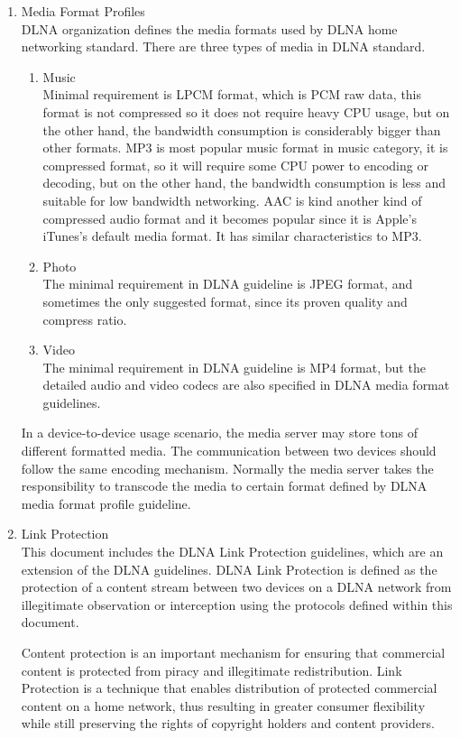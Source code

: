 \begin{enumerate}
\item Media Format Profiles \\
DLNA organization defines the media formats used by DLNA home networking standard. There are three types of media in DLNA standard.
\begin{enumerate}
\item Music \\
Minimal requirement is LPCM format, which is PCM raw data, this format is not compressed so it does not require heavy CPU usage, but on the other hand, the bandwidth consumption is considerably bigger than other formats.
MP3 is most popular music format in music category, it is compressed format, so it will require some CPU power to encoding or decoding, but on the other hand, the bandwidth consumption is less and suitable for low bandwidth networking.
AAC is kind another kind of compressed audio format and it becomes popular since it is Apple's iTunes's default media format. It has similar characteristics to MP3.
\item Photo \\
The minimal requirement in DLNA guideline is JPEG format, and sometimes the only suggested format, since its proven quality and compress ratio.
\item Video \\
The minimal requirement in DLNA guideline is MP4 format, but the detailed audio and video codecs are also specified in DLNA media format guidelines.
\end{enumerate}
In a device-to-device usage scenario, the media server may store tons of different formatted media. The communication between two devices should follow the same encoding mechanism. Normally the media server takes the responsibility to transcode the media to certain format defined by DLNA media format profile guideline. 
\item Link Protection \\
This document includes the DLNA Link Protection guidelines, which are an extension of the DLNA guidelines. DLNA Link Protection is defined as the protection of a content stream between two devices on a DLNA network from illegitimate observation or interception using the protocols defined within this document.

Content protection is an important mechanism for ensuring that commercial content is protected from piracy and illegitimate redistribution. Link Protection is a technique that enables distribution of protected commercial content on a home network, thus resulting in greater consumer flexibility while still preserving the rights of copyright holders and content providers.


\end{enumerate}
